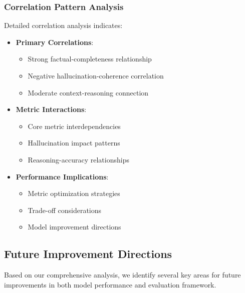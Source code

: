 \subsubsection{Correlation Pattern Analysis}
Detailed correlation analysis indicates:
\begin{itemize}
    \item \textbf{Primary Correlations}:
    \begin{itemize}
        \item Strong factual-completeness relationship
        \item Negative hallucination-coherence correlation
        \item Moderate context-reasoning connection
    \end{itemize}
    \item \textbf{Metric Interactions}:
    \begin{itemize}
        \item Core metric interdependencies
        \item Hallucination impact patterns
        \item Reasoning-accuracy relationships
    \end{itemize}
    \item \textbf{Performance Implications}:
    \begin{itemize}
        \item Metric optimization strategies
        \item Trade-off considerations
        \item Model improvement directions
    \end{itemize}
\end{itemize}

\subsection{Future Improvement Directions}
Based on our comprehensive analysis, we identify several key areas for future improvements in both model performance and evaluation framework.

